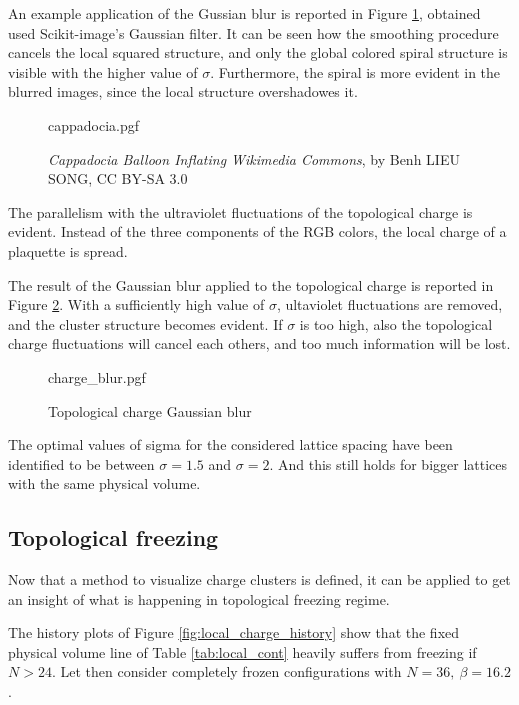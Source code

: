 An example application of the Gussian blur is reported in Figure \ref{fig:cappadocia}, obtained used Scikit-image's Gaussian filter.
It can be seen how the smoothing procedure cancels the local squared structure,
and only the global colored spiral structure is visible with the higher value of $\sigma$.
Furthermore, the spiral is more evident in the blurred images, since the local structure overshadowes it.

\begin{figure}[!htb]
    \centering
    {cappadocia.pgf}
    \caption{\emph{Cappadocia Balloon Inflating Wikimedia Commons}, by Benh LIEU SONG, CC BY-SA 3.0}
    \label{fig:cappadocia}
\end{figure}

The parallelism with the ultraviolet fluctuations of the topological charge is evident.
Instead of the three components of the RGB colors, the local charge of a plaquette is spread.

The result of the Gaussian blur applied to the topological charge is reported in Figure \ref{fig:charge_blur}.
With a sufficiently high value of $\sigma$, ultaviolet fluctuations are removed,
and the cluster structure becomes evident.
If $\sigma$ is too high, also the topological charge fluctuations will cancel each others,
and too much information will be lost.

\begin{figure}[!htb]
    \centering
    {charge_blur.pgf}
    \caption{Topological charge Gaussian blur}
    \label{fig:charge_blur}
\end{figure}

The optimal values of sigma for the considered lattice spacing have been identified to be between $\sigma=1.5$ and $\sigma=2$.
And this still holds for bigger lattices with the same physical volume.

\subsection*{Topological freezing}
Now that a method to visualize charge clusters is defined,
it can be applied to get an insight of what is happening in topological freezing regime.

The history plots of Figure \ref{fig:local_charge_history} show that the fixed physical volume line of Table \ref{tab:local_cont}
heavily suffers from freezing if $N>24$.
Let then consider completely frozen configurations with $N=36,\ \beta=16.2$.

